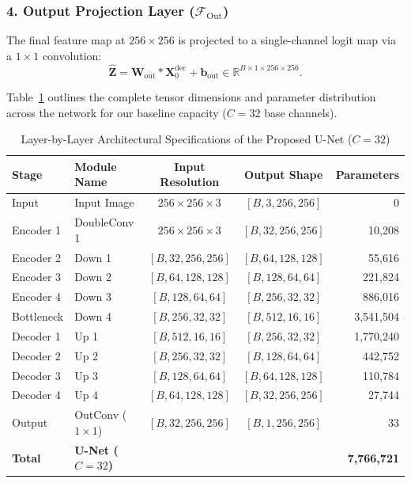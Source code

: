 \documentclass[10pt,a4paper]{report}
\begin{document}
\subsubsection{4. Output Projection Layer ($\mathcal{F}_{\text{Out}}$)}
The final feature map at $256 \times 256$ is projected to a single-channel logit map via a $1 \times 1$ convolution:
\begin{equation}
\hat{\mathbf{Z}} = \mathbf{W}_{\text{out}} * \mathbf{X}_{0}^{\text{dec}} + \mathbf{b}_{\text{out}} \in \mathbb{R}^{B \times 1 \times 256 \times 256}.
\end{equation}

Table~\ref{tab:unet_specs} outlines the complete tensor dimensions and parameter distribution across the network for our baseline capacity ($C = 32$ base channels).

\begin{table}[htbp]
\centering
\small
\caption{Layer-by-Layer Architectural Specifications of the Proposed U-Net ($C=32$)}
\label{tab:unet_specs}
\begin{tabular}{llccr}
\toprule
\textbf{Stage} & \textbf{Module Name} & \textbf{Input Resolution} & \textbf{Output Shape} & \textbf{Parameters} \\
\midrule
Input & Input Image & $256 \times 256 \times 3$ & $[B, 3, 256, 256]$ & 0 \\
Encoder 1 & DoubleConv 1 & $256 \times 256 \times 3$ & $[B, 32, 256, 256]$ & 10,208 \\
Encoder 2 & Down 1 & $[B, 32, 256, 256]$ & $[B, 64, 128, 128]$ & 55,616 \\
Encoder 3 & Down 2 & $[B, 64, 128, 128]$ & $[B, 128, 64, 64]$ & 221,824 \\
Encoder 4 & Down 3 & $[B, 128, 64, 64]$ & $[B, 256, 32, 32]$ & 886,016 \\
Bottleneck & Down 4 & $[B, 256, 32, 32]$ & $[B, 512, 16, 16]$ & 3,541,504 \\
Decoder 1 & Up 1 & $[B, 512, 16, 16]$ & $[B, 256, 32, 32]$ & 1,770,240 \\
Decoder 2 & Up 2 & $[B, 256, 32, 32]$ & $[B, 128, 64, 64]$ & 442,752 \\
Decoder 3 & Up 3 & $[B, 128, 64, 64]$ & $[B, 64, 128, 128]$ & 110,784 \\
Decoder 4 & Up 4 & $[B, 64, 128, 128]$ & $[B, 32, 256, 256]$ & 27,744 \\
Output & OutConv ($1\times 1$) & $[B, 32, 256, 256]$ & $[B, 1, 256, 256]$ & 33 \\
\midrule
\textbf{Total} & \textbf{U-Net ($C=32$)} & & & \textbf{7,766,721} \\
\bottomrule
\end{tabular}
\end{table}
\end{document}
